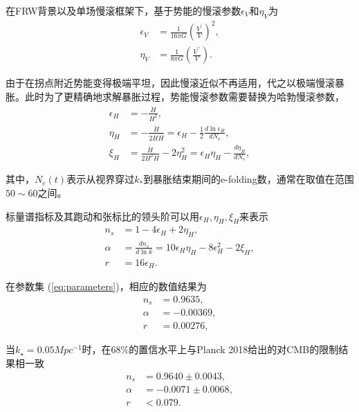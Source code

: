 在FRW背景以及单场慢滚框架下，基于势能的慢滚参数$\epsilon_V$和$\eta_V$为
\begin{align}
    \epsilon_V &= \frac{1}{16\pi G}{\left(\frac{V^\prime}{V}\right)}^2, \\
    \eta_V &= \frac{1}{8\pi G} {\left(\frac{V^{\prime\prime}}{V}\right)}.
\end{align}

由于在拐点附近势能变得极端平坦，因此慢滚近似不再适用\citep{dimopoulos2017ultra,germani2017primordial}，代之以极端慢滚暴胀。此时为了更精确地求解暴胀过程，势能慢滚参数需要替换为哈勃慢滚参数\citep{schwarz2001higher,leach2002cosmological,schwarz2004primordial}，
\begin{align}
    \epsilon_H &= -\frac{\dot{H}}{H^2}, \\
    \eta_H &= -\frac{\ddot{H}}{2H\dot{H}}=\epsilon_H-\frac{1}{2}\frac{d \ln\epsilon_H}{dN_e}, \\
    \xi_H &=
    \frac{\dddot{H}}{2H^2\dot{H}}-2\eta^2_H=\epsilon_H\eta_H-\frac{d\eta_H}{dN_e},
\end{align}

其中，$N_e(t)$表示从视界穿过$k_{*}$到暴胀结束期间的e-folding数，通常在取值在范围$50\sim60$之间。

标量谱指标及其跑动和张标比的领头阶可以用$\epsilon_H,\eta_H,\xi_H$来表示
\begin{align}
    n_s &= 1- 4\epsilon_H+2\eta_H, \\
    \alpha &= \frac{dn_s}{d\ln k}=10\epsilon_H\eta_H-8\epsilon_H^2-2\xi_H, \\
    r &= 16\epsilon_H.
\end{align}

在参数集 (\ref{eq:parameters})，相应的数值结果为
\begin{align}
  n_s &= 0.9635,\\
  \alpha&=-0.00369,\\
  r&=0.00276,
\end{align}

当$k_{\star}=0.05Mpc^{-1}$时，在$68\%$的置信水平上与Planck
2018给出的对CMB的限制结果相一致\citep{akrami2018planck}
\begin{align}
  n_s &= 0.9640\pm 0.0043,\\
  \alpha &= -0.0071\pm 0.0068,\\
  r &< 0.079.
\end{align}

